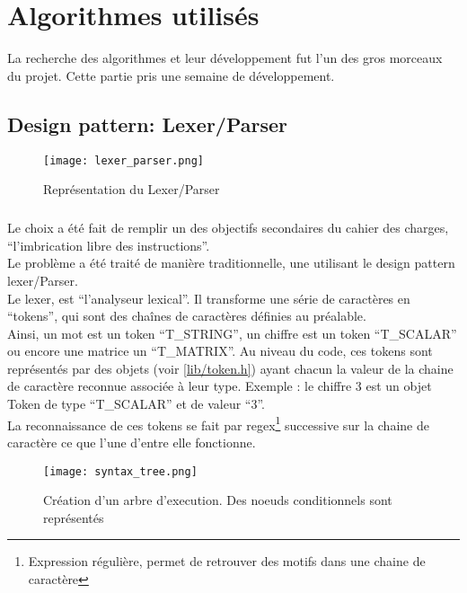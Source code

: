 \chapter{Algorithmes utilisés}
    La recherche des algorithmes et leur développement fut l'un des gros morceaux du projet. Cette partie pris une semaine de développement.

    \section{Design pattern: Lexer/Parser}
        \begin{figure}[h]
            \begin{center}
                \texttt{[image: lexer\_parser.png]}
            \end{center}

            \caption{Représentation du Lexer/Parser}
            \label{Représentation du Lexer/Parser}
        \end{figure}

        \paragraph{}
            Le choix a été fait de remplir un des objectifs secondaires du cahier des charges, ``l'imbrication libre des instructions''.
            \\ Le problème a été traité de manière traditionnelle, une utilisant le design pattern lexer/Parser.
            \\ Le lexer, est ``l'analyseur lexical''. Il transforme une série de caractères en ``tokens'', qui sont des chaînes de caractères définies au préalable.
            \\ Ainsi, un mot est un token ``T\_STRING'', un chiffre est un token ``T\_SCALAR'' ou encore une matrice un ``T\_MATRIX''. Au niveau du code, ces tokens sont représentés par des objets (voir \ref{lib/token.h}) ayant chacun la valeur de la chaine de caractère reconnue associée à leur type. Exemple : le chiffre 3 est un objet Token de type ``T\_SCALAR'' et de valeur ``3''.
            \\ La reconnaissance de ces tokens se fait par regex\footnote{Expression régulière, permet de retrouver des motifs dans une chaine de caractère} successive sur la chaine de caractère ce que l'une d'entre elle fonctionne.
      
            \begin{figure}[h]
                \begin{center}
                    \texttt{[image: syntax\_tree.png]}
                \end{center}

                \caption{Création d'un arbre d'execution. Des noeuds conditionnels sont représentés}
                \label{Représentation arbre syntaxique}
            \end{figure}

